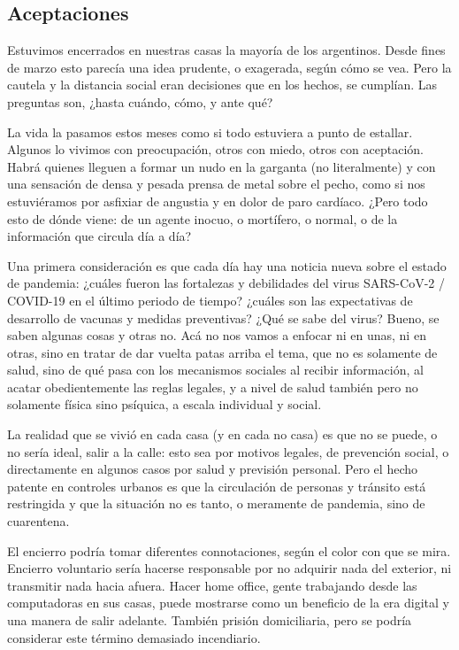 \subsection*{Aceptaciones}

Estuvimos encerrados en nuestras casas la mayoría de los argentinos.
Desde fines de marzo esto parecía una idea prudente, o exagerada, según cómo se vea.
Pero la cautela y la distancia social eran decisiones que en los hechos, se cumplían.
Las preguntas son, ¿hasta cuándo, cómo, y ante qué?

La vida la pasamos estos meses como si todo estuviera a punto de estallar.
Algunos lo vivimos con preocupación, otros con miedo, otros
con aceptación. Habrá quienes lleguen a formar un nudo en la garganta
(no literalmente) y con una sensación de densa y pesada prensa de metal
sobre el pecho, como si nos estuviéramos por asfixiar de angustia y en
dolor de paro cardíaco. ¿Pero todo esto de dónde viene: de un agente
inocuo, o mortífero, o normal, o de la información que circula día a día?

Una primera consideración es que cada día hay una noticia nueva sobre el estado de pandemia:
¿cuáles fueron las fortalezas y debilidades del virus SARS-CoV-2 / COVID-19 en el último periodo de tiempo?
¿cuáles son las expectativas de desarrollo de vacunas y medidas preventivas?
¿Qué se sabe del virus? Bueno, se saben algunas cosas y otras no. 
Acá no nos vamos a enfocar ni en unas, ni en otras, sino en tratar de dar vuelta patas arriba el tema, que no es solamente de salud, sino de qué pasa con los mecanismos sociales al recibir información,
al acatar obedientemente las reglas legales, 
y a nivel de salud también pero no solamente física sino psíquica, a escala individual y social.

La realidad que se vivió en cada casa (y en cada no casa) es que no se puede, o no sería ideal, salir a la calle:
esto sea por motivos legales, de prevención social, o directamente en algunos casos por salud y previsión personal.
Pero el hecho patente en controles urbanos es que la circulación de personas y tránsito está restringida
y que la situación no es tanto, o meramente de pandemia, sino de cuarentena.

El encierro podría tomar diferentes connotaciones, según el color con que se mira.
Encierro voluntario sería hacerse responsable por no adquirir nada del exterior, ni transmitir nada hacia afuera.
Hacer home office, gente trabajando desde las computadoras en sus casas, puede mostrarse como un beneficio de la era digital y una manera de salir adelante.
También prisión domiciliaria, pero se podría considerar este término demasiado incendiario.

